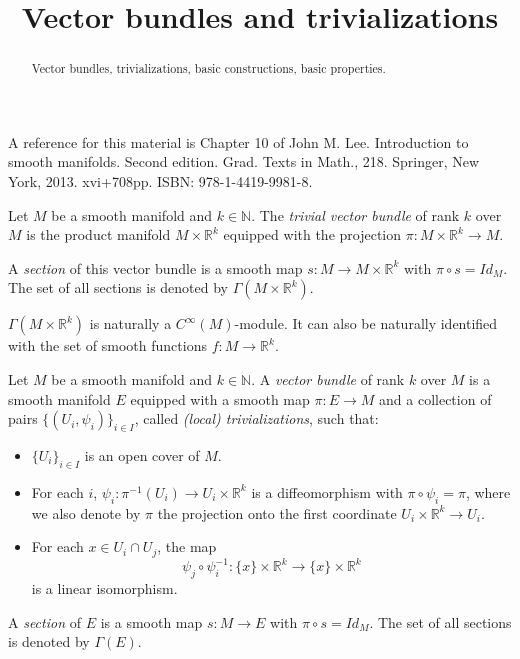 \documentclass{ximera}
\title{Vector bundles and trivializations}
\begin{document}
    \begin{abstract} Vector bundles, trivializations, basic constructions, basic properties. \end{abstract}
    \maketitle

A reference for this material is Chapter 10  of John M. Lee. Introduction to smooth manifolds. Second edition. Grad. Texts in Math., 218. Springer, New York, 2013. xvi+708pp. ISBN: 978-1-4419-9981-8. 

\begin{definition}
 Let $M$ be a smooth manifold and $k \in \mathbb{N}$. The \emph{trivial vector bundle}  of rank $k$ over $M$ is the product manifold $M \times \mathbb{R}^k$ equipped with the projection $\pi : M \times \mathbb{R}^k \to M $. 

 A \emph{section} of this vector bundle is a smooth map $s : M \to  M \times \mathbb{R}^k$ with $\pi \circ s = Id_M$. The set of all sections is denoted by $\Gamma (M \times \mathbb{R}^k)$.    
\end{definition}

\begin{remark}
$\Gamma ( M \times \mathbb{R}^k) $ is naturally a $C^{\infty}(M)$-module. It can also be  naturally identified with the set of smooth functions $f : M \to \mathbb{R}^k$.  
\end{remark}

\begin{definition}

 Let $M$ be a smooth manifold and $k \in \mathbb{N}$. A \emph{vector bundle} of rank $k$ over $M$ is a smooth manifold $E$ equipped with a smooth map $\pi : E \to M$ and a collection of pairs $\{ ( U _i, \psi _i ) \} _{i \in I }$, called \emph{(local) trivializations}, such that:
 \begin{itemize}
     \item $\{ U_i \} _{i \in I }$ is an open cover of $M$. 
     \item For each $i$, $\psi _ i : \pi ^{-1} (U_i) \to U _i \times \mathbb{R}^k$ is a diffeomorphism with $\pi \circ \psi _i = \pi $, where we also denote by $\pi$ the projection onto the first coordinate $U_i \times \mathbb{R}^k \to U_i$.
     \item For each $x \in U_i \cap U_j$, the map 
     \[ \psi _j \circ \psi _i ^{-1} :  \{ x \} \times \mathbb{R}^k  \to \{ x \} \times \mathbb{R}^k  \] 
     is a linear isomorphism. 
 \end{itemize}
A \emph{section} of $E$ is a smooth map $s : M \to  E $ with $\pi \circ s = Id_M$. The set of all sections is denoted by $\Gamma (E)$.   
\end{definition}
\end{document}
